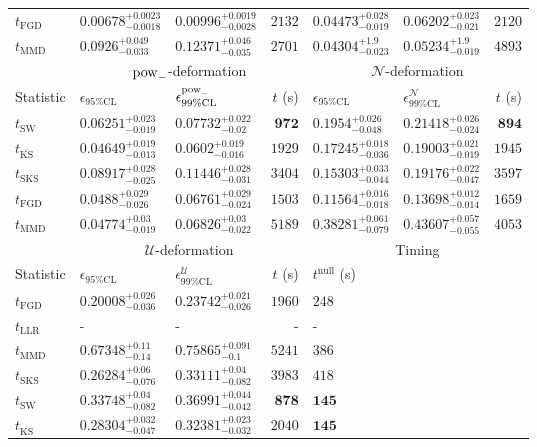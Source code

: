 \begin{tabular}{l|llr|llr}
	$t_{\mathrm{FGD}}$ & ${\mathbf{0.00678_{-0.0018}^{+0.0023}}}$ & ${\mathbf{0.00996_{-0.0028}^{+0.0019}}}$ & $2132$ & $0.04473_{-0.019}^{+0.028}$ & $0.06202_{-0.021}^{+0.023}$ & $2120$ \\
	$t_{\mathrm{MMD}}$ & $0.0926_{-0.033}^{+0.049}$ & $0.12371_{-0.035}^{+0.046}$ & $2701$ & ${\mathbf{0.04304_{-0.023}^{+1.9}}}$ & ${\mathbf{0.05234_{-0.019}^{+1.9}}}$ & $4893$ \\
	\toprule
	\multicolumn{1}{c}{} & \multicolumn{3}{c}{$\rm{pow}_{-}$-deformation} & \multicolumn{3}{c}{$\mathcal{N}$-deformation} \\
	Statistic & $\epsilon_{95\%\mathrm{CL}}$ & $\epsilon^  {\rm{pow}_{-}}_{99\%\mathrm{CL}}$ & $t$ (s) & $\epsilon_{95\%\mathrm{CL}}$ & $\epsilon^    {\mathcal{N}}_{99\%\mathrm{CL}}$ & $t$ (s) \\
	\midrule
	$t_{\mathrm{SW}}$ & $0.06251_{-0.019}^{+0.023}$ & $0.07732_{-0.02}^{+0.022}$ & ${\mathbf{972}}$ & $0.1954_{-0.048}^{+0.026}$ & $0.21418_{-0.024}^{+0.026}$ & ${\mathbf{894}}$ \\
	$t_{\overline{\mathrm{KS}}}$ & ${\mathbf{0.04649_{-0.013}^{+0.019}}}$ & ${\mathbf{0.0602_{-0.016}^{+0.019}}}$ & $1929$ & $0.17245_{-0.036}^{+0.018}$ & $0.19003_{-0.019}^{+0.021}$ & $1945$ \\
	$t_{\mathrm{SKS}}$ & $0.08917_{-0.025}^{+0.028}$ & $0.11446_{-0.031}^{+0.028}$ & $3404$ & $0.15303_{-0.044}^{+0.033}$ & $0.19176_{-0.047}^{+0.022}$ & $3597$ \\
	$t_{\mathrm{FGD}}$ & $0.0488_{-0.026}^{+0.029}$ & $0.06761_{-0.024}^{+0.029}$ & $1503$ & ${\mathbf{0.11564_{-0.018}^{+0.016}}}$ & ${\mathbf{0.13698_{-0.014}^{+0.012}}}$ & $1659$ \\
	$t_{\mathrm{MMD}}$ & $0.04774_{-0.019}^{+0.03}$ & $0.06826_{-0.022}^{+0.03}$ & $5189$ & $0.38281_{-0.079}^{+0.061}$ & $0.43607_{-0.055}^{+0.057}$ & $4053$ \\
	\toprule
	\multicolumn{1}{c}{} & \multicolumn{3}{c}{$\mathcal{U}$-deformation} & \multicolumn{3}{c}{Timing} \\
	Statistic & $\epsilon_{95\%\mathrm{CL}}$ & $\epsilon^    {\mathcal{U}}_{99\%\mathrm{CL}}$ & $t$ (s) & $t^{\mathrm{null}}$ (s) \\
	\midrule
	$t_{\mathrm{FGD}}$ & ${\mathbf{0.20008_{-0.036}^{+0.026}}}$ & ${\mathbf{0.23742_{-0.026}^{+0.021}}}$ & $1960$ & $248$ \\
	$t_{\mathrm{LLR}}$ & - & - & - & - \\
	$t_{\mathrm{MMD}}$ & $0.67348_{-0.14}^{+0.11}$ & $0.75865_{-0.1}^{+0.091}$ & $5241$ & $386$ \\
	$t_{\mathrm{SKS}}$ & $0.26284_{-0.076}^{+0.06}$ & $0.33111_{-0.082}^{+0.04}$ & $3983$ & $418$ \\
	$t_{\mathrm{SW}}$ & $0.33748_{-0.082}^{+0.04}$ & $0.36991_{-0.042}^{+0.044}$ & ${\mathbf{878}}$ & ${\mathbf{145}}$ \\
	$t_{\overline{\mathrm{KS}}}$ & $0.28304_{-0.047}^{+0.032}$ & $0.32381_{-0.032}^{+0.023}$ & $2040$ & ${\mathbf{145}}$ \\
	\bottomrule
\end{tabular}
